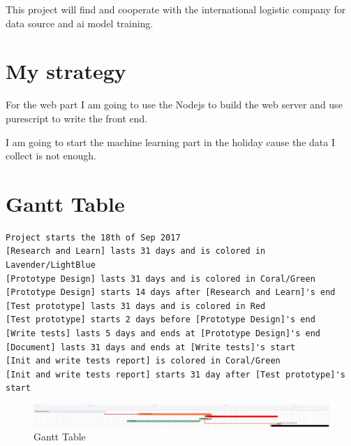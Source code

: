 \documentclass[setspace, doublespace]{scrartcl}
\begin{document}
This project will find and cooperate with the international logistic company for data source and ai model training.

\section{My strategy}
\label{sec:orgde7f2c2}

For the web part I am going to use the Nodejs to build the web server and use purescript to write the front end.

I am going to start the machine learning part in the holiday cause the data I collect is not enough.

\section{Gantt Table}
\label{sec:orgd625beb}
\begin{verbatim}
Project starts the 18th of Sep 2017
[Research and Learn] lasts 31 days and is colored in Lavender/LightBlue
[Prototype Design] lasts 31 days and is colored in Coral/Green
[Prototype Design] starts 14 days after [Research and Learn]'s end
[Test prototype] lasts 31 days and is colored in Red
[Test prototype] starts 2 days before [Prototype Design]'s end
[Write tests] lasts 5 days and ends at [Prototype Design]'s end
[Document] lasts 31 days and ends at [Write tests]'s start
[Init and write tests report] is colored in Coral/Green
[Init and write tests report] starts 31 day after [Test prototype]'s start
\end{verbatim}

\begin{figure}[htbp]
\caption{\label{fig:orgb0a6ab5}
Gantt Table}
\centering
\includegraphics[width=.9\linewidth]{img/gantt.png}
\end{figure}
\end{document}
